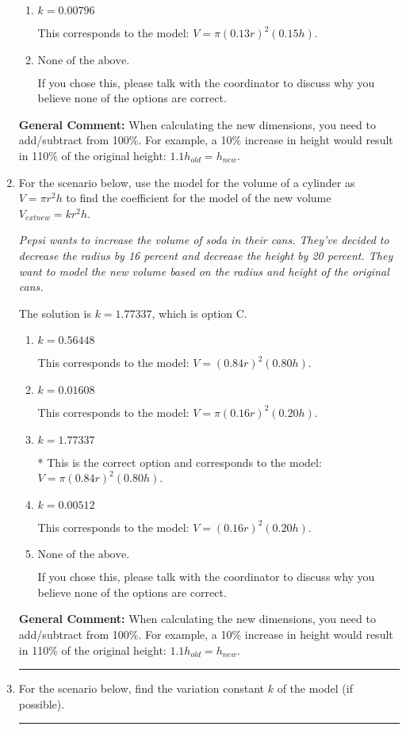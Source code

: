 \documentclass{extbook}[14pt]
\newcommand{\litem}[1]{\item #1

\rule{\textwidth}{0.4pt}}
\begin{document}
\begin{enumerate}
{\begin{enumerate}[label=\Alph*.]
This corresponds to the model: $V = (0.87 r)^2 (0.85 h)$.
\item \( k = 0.00796 \)

This corresponds to the model: $V = \pi (0.13 r)^2 (0.15 h)$.
\item \( \text{None of the above.} \)

If you chose this, please talk with the coordinator to discuss why you believe none of the options are correct.
\end{enumerate}

\textbf{General Comment:} When calculating the new dimensions, you need to add/subtract from 100\%. For example, a 10\% increase in height would result in 110\% of the original height: $1.1h_{old} = h_{new}$.
}
\litem{
For the scenario below, use the model for the volume of a cylinder as $V = \pi r^2 h$ to find the coefficient for the model of the new volume $V_{	ext{new}} = k r^2 h$.

\begin{center}
    \textit{ Pepsi wants to increase the volume of soda in their cans. They've decided to decrease the radius by 16 percent and decrease the height by 20 percent. They want to model the new volume based on the radius and height of the original cans. }
\end{center}


The solution is \( k = 1.77337 \), which is option C.\begin{enumerate}[label=\Alph*.]
\item \( k = 0.56448 \)

This corresponds to the model: $V = (0.84 r)^2 (0.80 h)$.
\item \( k = 0.01608 \)

This corresponds to the model: $V = \pi (0.16 r)^2 (0.20 h)$.
\item \( k = 1.77337 \)

* This is the correct option and corresponds to the model: $V = \pi (0.84 r)^2 (0.80 h)$.
\item \( k = 0.00512 \)

This corresponds to the model: $V = (0.16 r)^2 (0.20 h)$.
\item \( \text{None of the above.} \)

If you chose this, please talk with the coordinator to discuss why you believe none of the options are correct.
\end{enumerate}

\textbf{General Comment:} When calculating the new dimensions, you need to add/subtract from 100\%. For example, a 10\% increase in height would result in 110\% of the original height: $1.1h_{old} = h_{new}$.
}
\litem{
For the scenario below, find the variation constant $k$ of the model (if possible).

}
\end{enumerate}
\end{document}
